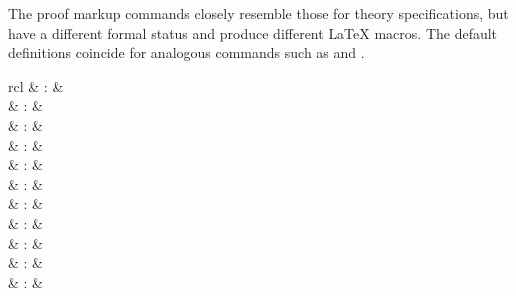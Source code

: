 \begin{isabellebody}
\begin{isamarkuptext}
  \medskip The proof markup commands closely resemble those for theory
  specifications, but have a different formal status and produce
  different {\LaTeX} macros.  The default definitions coincide for
  analogous commands such as \hyperlink{command.section}{\mbox{}} and \hyperlink{command.sect}{\mbox{}}.%
\end{isamarkuptext}%
\isamarkuptrue%
%
\isamarkuptrue%
%
\begin{isamarkuptext}%
\begin{matharray}{rcl}
    \hypertarget{antiquotation.theory}{\hyperlink{antiquotation.theory}{\mbox{}}} & : &  \\
    \hypertarget{antiquotation.thm}{\hyperlink{antiquotation.thm}{\mbox{}}} & : &  \\
    \hypertarget{antiquotation.lemma}{\hyperlink{antiquotation.lemma}{\mbox{}}} & : &  \\
    \hypertarget{antiquotation.prop}{\hyperlink{antiquotation.prop}{\mbox{}}} & : &  \\
    \hypertarget{antiquotation.term}{\hyperlink{antiquotation.term}{\mbox{}}} & : &  \\
    \hypertarget{antiquotation.term-type}{\hyperlink{antiquotation.term-type}{\mbox{}}} & : &  \\
    \hypertarget{antiquotation.typeof}{\hyperlink{antiquotation.typeof}{\mbox{}}} & : &  \\
    \hypertarget{antiquotation.const}{\hyperlink{antiquotation.const}{\mbox{}}} & : &  \\
    \hypertarget{antiquotation.abbrev}{\hyperlink{antiquotation.abbrev}{\mbox{}}} & : &  \\
    \hypertarget{antiquotation.typ}{\hyperlink{antiquotation.typ}{\mbox{}}} & : &  \\
    \hypertarget{antiquotation.text}{\hyperlink{antiquotation.text}{\mbox{}}} & : &  \\

\end{matharray}
\end{isamarkuptext}
\end{isabellebody}
